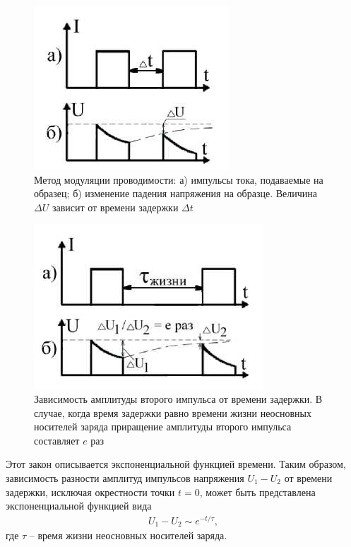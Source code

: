 \begin{figure}[H]
	\centering
	\includegraphics[]{img/9}
	\caption{Метод модуляции проводимости: а) импульсы тока, подаваемые на образец; б) изменение падения напряжения на образце. Величина $\Delta U$ зависит от времени задержки $\Delta t$}
	\label{fig:figure8}
\end{figure}

\begin{figure}[H]
	\centering
	\includegraphics[]{img/10}
	\caption{Зависимость амплитуды второго импульса от времени задержки. В случае, когда время задержки равно времени жизни неосновных носителей заряда приращение амплитуды второго импульса составляет $e$ раз}
	\label{fig:figure9}
\end{figure}



Этот закон описывается экспоненциальной функцией времени. Таким образом, зависимость разности амплитуд импульсов напряжения  $U_1-U_2$ от времени задержки, исключая окрестности точки $t = 0$, может быть представлена экспоненциальной функцией вида
\begin{gather}
	\label{eq17}
	U_{1}-U_{2} \sim e^{-t/\tau},
\end{gather}
где $\tau$ -- время жизни неосновных носителей заряда.

